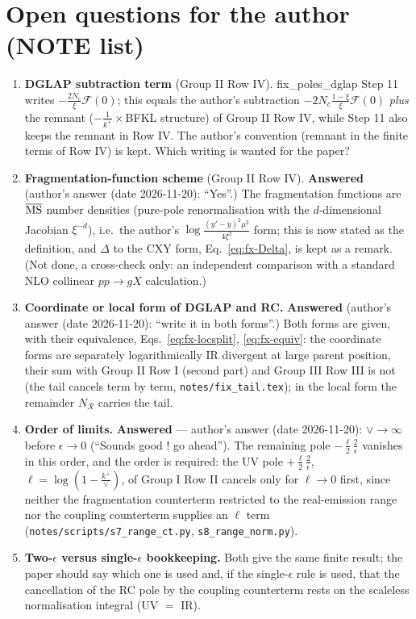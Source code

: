 {\color{red}
\section{Open questions for the author (NOTE list)}
\begin{enumerate}
\item \textbf{DGLAP subtraction term} (Group II Row IV). fix\_poles\_dglap Step 11 writes $-\frac{2N_{c}}{\xi}\mathcal{F}(0)$; this equals the author's subtraction $-2N_{c}\frac{1-\xi}{\xi}\mathcal{F}(0)$ \emph{plus} the remnant ($-\frac{1}{k^{+}}\times$BFKL structure) of Group II Row IV, while Step 11 also keeps the remnant in Row IV. The author's convention (remnant in the finite terms of Row IV) is kept. Which writing is wanted for the paper?
\item \textbf{Fragmentation-function scheme} (Group II Row IV). \textbf{Answered} (author's answer (date 2026-11-20): ``Yes''.) The fragmentation functions are $\overline{\rm MS}$ number densities (pure-pole renormalisation with the $d$-dimensional Jacobian $\xi^{-d}$), i.e.\ the author's $\log\frac{(y'-y)^{2}\mu^{2}}{4\xi^{2}}$ form; this is now stated as the definition, and $\Delta$ to the CXY form, Eq.~\eqref{eq:fx-Delta}, is kept as a remark. (Not done, a cross-check only: an independent comparison with a standard NLO collinear $pp\to gX$ calculation.)
\item \textbf{Coordinate or local form of DGLAP and RC.} \textbf{Answered} (author's answer (date 2026-11-20): ``write it in both forms''.) Both forms are given, with their equivalence, Eqs.~\eqref{eq:fx-locsplit}, \eqref{eq:fx-equiv}: the coordinate forms are separately logarithmically IR divergent at large parent position, their sum with Group II Row I (second part) and Group III Row III is not (the tail cancels term by term, \texttt{notes/fix\_tail.tex}); in the local form the remainder $N_{\mathcal{R}}$ carries the tail.
\item \textbf{Order of limits.} \textbf{Answered} --- author's answer (date 2026-11-20): $\vee\to\infty$ before $\epsilon\to0$ (``Sounds good ! go ahead''). The remaining pole $-\frac{\ell}{2}\frac{2}{\epsilon}$ vanishes in this order, and the order is required: the UV pole $+\frac{\ell}{2}\frac{2}{\epsilon}$, $\ell=\log(1-\frac{k^{+}}{\vee})$, of Group I Row II cancels only for $\ell\to0$ first, since neither the fragmentation counterterm restricted to the real-emission range nor the coupling counterterm supplies an $\ell$ term (\texttt{notes/scripts/s7\_range\_ct.py}, \texttt{s8\_range\_norm.py}).
\item \textbf{Two-$\epsilon$ versus single-$\epsilon$ bookkeeping.} Both give the same finite result; the paper should say which one is used and, if the single-$\epsilon$ rule is used, that the cancellation of the RC pole by the coupling counterterm rests on the scaleless normalisation integral (UV $=$ IR).
\end{enumerate}}\par
